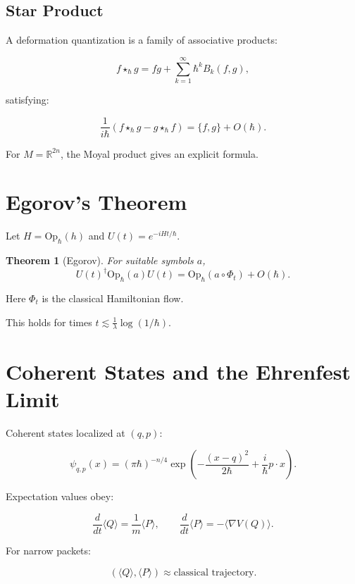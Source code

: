 \documentclass[11pt,a4paper]{article}
\newtheorem{theorem}{Theorem}
\begin{document}
\subsection{Star Product}

A deformation quantization is a family of associative products:

\[
f \star_\hbar g
=
fg + \sum_{k=1}^\infty \hbar^k B_k(f,g),
\]

satisfying:

\[
\frac{1}{i\hbar}(f\star_\hbar g - g\star_\hbar f)
=
\{f,g\} + O(\hbar).
\]

For $M=\mathbb R^{2n}$, the Moyal product gives an explicit formula.

\section{Egorov's Theorem}

Let $H = \mathrm{Op}_\hbar(h)$ and $U(t)=e^{-iHt/\hbar}$.

\begin{theorem}[Egorov]
For suitable symbols $a$,
\[
U(t)^\dagger \mathrm{Op}_\hbar(a) U(t)
=
\mathrm{Op}_\hbar(a\circ\Phi_t) + O(\hbar).
\]
\end{theorem}

Here $\Phi_t$ is the classical Hamiltonian flow.

This holds for times $t \lesssim \frac{1}{\lambda}\log(1/\hbar)$.

\section{Coherent States and the Ehrenfest Limit}

Coherent states localized at $(q,p)$:

\[
\psi_{q,p}(x)
=
(\pi\hbar)^{-n/4}
\exp\left(
-\frac{(x-q)^2}{2\hbar}
+\frac{i}{\hbar}p\cdot x
\right).
\]

Expectation values obey:

\[
\frac{d}{dt}\langle Q\rangle = \frac{1}{m}\langle P\rangle,
\qquad
\frac{d}{dt}\langle P\rangle = -\langle \nabla V(Q)\rangle.
\]

For narrow packets:

\[
(\langle Q\rangle,\langle P\rangle)
\approx
\text{classical trajectory}.
\]

\end{document}
